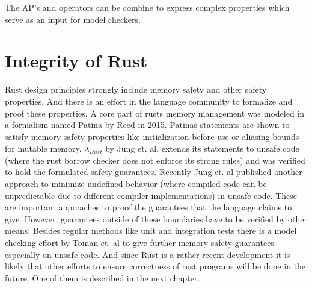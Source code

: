 The AP's and operators can be combine to express complex properties which serve as an input for model checkers.

\section{Integrity of Rust}
Rust design principles strongly include memory safety and other safety properties.
And there is an effort in the language community to formalize and proof these properties.
A core part of rusts memory management was modeled in a formalism named Patina by Reed\cite{reed2015patina} in 2015.
Patinas statements are shown to satisfy memory safety properties like initialization before use or aliasing bounds for mutable memory.
$\lambda_{Rust}$ by Jung et. al.\cite{Jung:2017:RSF:3177123.3158154} extends its statements to unsafe code (where the rust borrow checker does not enforce its strong rules) and was verified to hold the formulated safety guarantees.
Recently Jung et. al published another approach to minimize undefined behavior (where compiled code can be unpredictable due to different compiler implementations) in unsafe code.
These are important approaches to proof the guarantees that the language claims to give.
However, guarantees outside of these boundaries have to be verified by other means.
Besides regular methods like unit and integration tests there is a model checking effort by Toman et. al \cite{toman2015crust} to give further memory safety guarantees especially on unsafe code.
And since Rust is a rather recent development it is likely that other efforts to ensure correctness of rust programs will be done in the future.
One of them is described in the next chapter.
